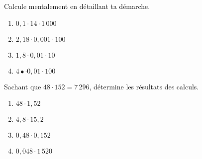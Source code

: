 \begin{exercice}
Calcule mentalement en détaillant ta démarche.
\begin{enumerate} 
 \item $0,1 \cdot 14 \cdot 1\,000$ \dotfill \hspace*{11em}
 
 \item $2,18 \cdot 0,001 \cdot 100$ \dotfill \hspace*{11em}

 \item $1,8 \cdot 0,01 \cdot 10$ \dotfill \hspace*{11em}

 \item $4 •\cdot 0,01 \cdot 100$ \dotfill \hspace*{11em}

 \end{enumerate} 
\end{exercice}


\begin{exercice}
Sachant que $48 \cdot 152 = 7\,296$, détermine les résultats des calculs.
\begin{enumerate} 
 \item $48 \cdot 1,52$ \dotfill \hspace*{11em}
 
 \item $4,8 \cdot 15,2$ \dotfill \hspace*{11em}
 
 \item $0,48 \cdot 0,152$ \dotfill \hspace*{11em}
 
 \item $0,048 \cdot 1\,520$ \dotfill \hspace*{11em}

 \end{enumerate} 
\end{exercice}


